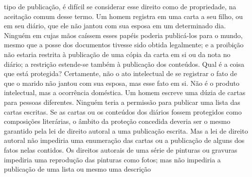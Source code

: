 tipo de publicação, é difícil se considerar esse direito como de
propriedade, na aceitação comum desse termo. Um homem registra em uma
carta a seu filho, ou em seu diário, que ele não jantou com sua esposa
em um determinado dia. Ninguém em cujas mãos caíssem esses papéis
poderia publicá-los para o mundo, mesmo que a posse dos documentos
tivesse sido obtida legalmente; e a proibição não estaria restrita à
publicação de uma cópia da carta em si ou da nota no diário; a restrição
estende-se também à publicação dos conteúdos. Qual é a coisa que está
protegida? Certamente, não o ato intelectual de se registrar o fato de
que o marido não jantou com sua esposa, mas esse fato em si. Não é o
produto intelectual, mas a ocorrência doméstica. Um homem escreve uma
dúzia de cartas para pessoas diferentes. Ninguém teria a permissão para
publicar uma lista das cartas escritas. Se as cartas ou os conteúdos dos
diários fossem protegidos como composições literárias, o âmbito da
proteção concedida deveria ser o mesmo garantido pela lei de direito
autoral a uma publicação escrita. Mas a lei de direito autoral não
impediria uma enumeração das cartas ou a publicação de alguns dos fatos
nelas contidos. Os direitos autorais de uma série de pinturas ou
gravuras impediria uma reprodução das pinturas como fotos; mas não
impediria a publicação de uma lista ou mesmo uma descrição
